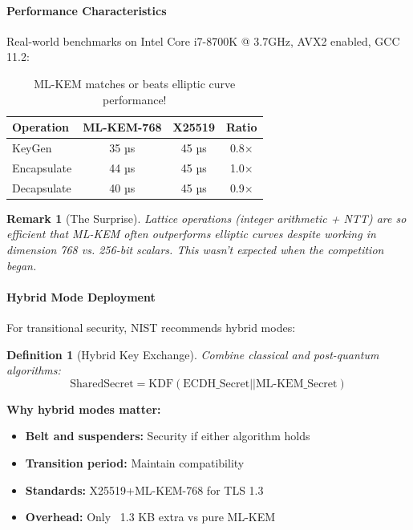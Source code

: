 \documentclass[11pt,a4paper]{article}
\newtheorem{definition}{Definition}
\newtheorem{remark}{Remark}
\begin{document}
\paragraph{Performance Characteristics}

Real-world benchmarks on Intel Core i7-8700K @ 3.7GHz, AVX2 enabled, GCC 11.2:

\begin{table}[h]
\centering
\begin{tabular}{|l|c|c|c|}
\hline
\textbf{Operation} & \textbf{ML-KEM-768} & \textbf{X25519} & \textbf{Ratio} \\
\hline
KeyGen & 35 µs & 45 µs & 0.8× \\
Encapsulate & 44 µs & 45 µs & 1.0× \\
Decapsulate & 40 µs & 45 µs & 0.9× \\
\hline
\end{tabular}
\caption{ML-KEM matches or beats elliptic curve performance!}
\end{table}

\begin{remark}[The Surprise]
Lattice operations (integer arithmetic + NTT) are so efficient that ML-KEM often outperforms elliptic curves despite working in dimension 768 vs. 256-bit scalars. This wasn't expected when the competition began.
\end{remark}

\paragraph{Hybrid Mode Deployment}

For transitional security, NIST recommends hybrid modes:

\begin{definition}[Hybrid Key Exchange]
Combine classical and post-quantum algorithms:
$$\text{SharedSecret} = \text{KDF}(\text{ECDH\_Secret} || \text{ML-KEM\_Secret})$$
\end{definition}

\textbf{Why hybrid modes matter:}
\begin{itemize}
    \item \textbf{Belt and suspenders:} Security if either algorithm holds
    \item \textbf{Transition period:} Maintain compatibility
    \item \textbf{Standards:} X25519+ML-KEM-768 for TLS 1.3
    \item \textbf{Overhead:} Only ~1.3 KB extra vs pure ML-KEM
\end{itemize}
\end{document}

